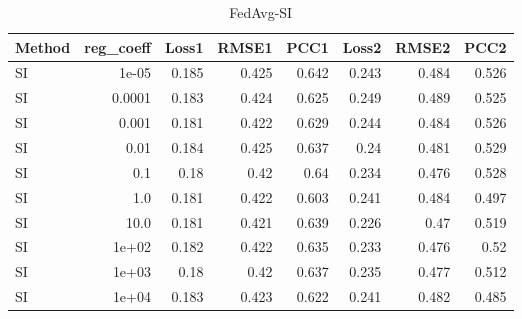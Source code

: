 \begin{table}
\caption{FedAvg-SI}
\begin{tabular}{lrrrrrrr}
\toprule
Method & reg_coeff & Loss1 & RMSE1 & PCC1 & Loss2 & RMSE2 & PCC2 \\
\midrule
SI & 1e-05 & 0.185 & 0.425 & 0.642 & 0.243 & 0.484 & 0.526 \\
SI & 0.0001 & 0.183 & 0.424 & 0.625 & 0.249 & 0.489 & 0.525 \\
SI & 0.001 & 0.181 & 0.422 & 0.629 & 0.244 & 0.484 & 0.526 \\
SI & 0.01 & 0.184 & 0.425 & 0.637 & 0.24 & 0.481 & 0.529 \\
SI & 0.1 & 0.18 & 0.42 & 0.64 & 0.234 & 0.476 & 0.528 \\
SI & 1.0 & 0.181 & 0.422 & 0.603 & 0.241 & 0.484 & 0.497 \\
SI & 10.0 & 0.181 & 0.421 & 0.639 & 0.226 & 0.47 & 0.519 \\
SI & 1e+02 & 0.182 & 0.422 & 0.635 & 0.233 & 0.476 & 0.52 \\
SI & 1e+03 & 0.18 & 0.42 & 0.637 & 0.235 & 0.477 & 0.512 \\
SI & 1e+04 & 0.183 & 0.423 & 0.622 & 0.241 & 0.482 & 0.485 \\
\bottomrule
\end{tabular}
\end{table}
